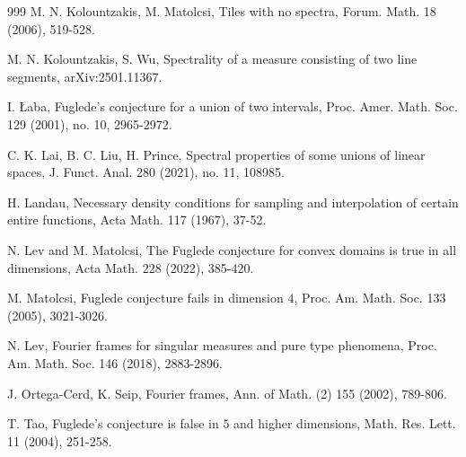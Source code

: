 \documentclass[12pt,psfig,reqno]{amsart}
\numberwithin{equation}{section}
\theoremstyle{plain}
\begin{document}
\begin{thebibliography}{999}
M. N. Kolountzakis, M. Matolcsi, Tiles with no spectra, Forum. Math. 18 (2006), 519-528.

M. N. Kolountzakis, S. Wu, Spectrality of a measure consisting of two line segments, arXiv:2501.11367. 

I. {\L}aba, Fuglede's conjecture for a union of two intervals, Proc. Amer. Math. Soc. 129 (2001), no. 10, 2965-2972.

C. K. Lai, B. C. Liu, H. Prince, Spectral properties of some unions of linear spaces, J. Funct. Anal. 280 (2021), no. 11, 108985.

H. Landau, Necessary density conditions for sampling and interpolation of certain entire functions, Acta Math. 117 (1967), 37-52.

N. Lev and M. Matolcsi, The Fuglede conjecture for convex domains is true in all dimensions, Acta Math. 228 (2022), 385-420.

  M. Matolcsi, Fuglede conjecture fails in dimension $4$, Proc. Am. Math. Soc. 133 (2005), 3021-3026.

  N. Lev, Fourier frames for singular measures and pure type phenomena, Proc. Am. Math. Soc. 146 (2018), 2883-2896.

  J. Ortega-Cerd, K. Seip, Fourier frames, Ann. of Math. (2) 155 (2002), 789-806.

T. Tao, Fuglede's conjecture is false in $5$ and higher dimensions, Math. Res. Lett. 11 (2004), 251-258.

\end{thebibliography}
\end{document}
